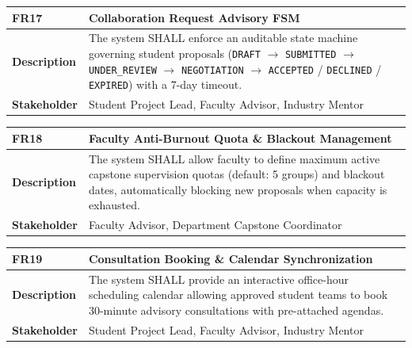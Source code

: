 \begin{table}[H]
\centering
\small
\begin{tabularx}{\textwidth}{|l|X|}
\hline
\rowcolor{lightgray!40} \textbf{FR17} & \textbf{Collaboration Request Advisory FSM} \\ \hline
\textbf{Description} & The system SHALL enforce an auditable state machine governing student proposals (\texttt{DRAFT} $\rightarrow$ \texttt{SUBMITTED} $\rightarrow$ \texttt{UNDER\_REVIEW} $\rightarrow$ \texttt{NEGOTIATION} $\rightarrow$ \texttt{ACCEPTED} / \texttt{DECLINED} / \texttt{EXPIRED}) with a 7-day timeout. \\ \hline
\textbf{Stakeholder} & Student Project Lead, Faculty Advisor, Industry Mentor \\ \hline
\end{tabularx}
\end{table}

\begin{table}[H]
\centering
\small
\begin{tabularx}{\textwidth}{|l|X|}
\hline
\rowcolor{lightgray!40} \textbf{FR18} & \textbf{Faculty Anti-Burnout Quota \& Blackout Management} \\ \hline
\textbf{Description} & The system SHALL allow faculty to define maximum active capstone supervision quotas (default: 5 groups) and blackout dates, automatically blocking new proposals when capacity is exhausted. \\ \hline
\textbf{Stakeholder} & Faculty Advisor, Department Capstone Coordinator \\ \hline
\end{tabularx}
\end{table}

\begin{table}[H]
\centering
\small
\begin{tabularx}{\textwidth}{|l|X|}
\hline
\rowcolor{lightgray!40} \textbf{FR19} & \textbf{Consultation Booking \& Calendar Synchronization} \\ \hline
\textbf{Description} & The system SHALL provide an interactive office-hour scheduling calendar allowing approved student teams to book 30-minute advisory consultations with pre-attached agendas. \\ \hline
\textbf{Stakeholder} & Student Project Lead, Faculty Advisor, Industry Mentor \\ \hline
\end{tabularx}
\end{table}

